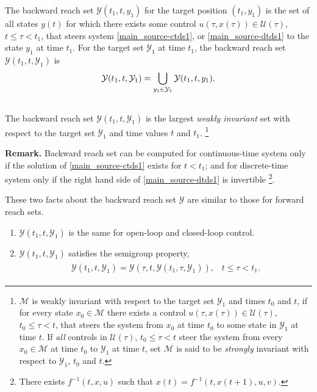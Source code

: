 \documentclass[letterpaper,10pt,english]{sphinxmanual}
\begin{document}
The backward reach set ${\mathcal Y}(t_1, t, y_1)$ for the target
position $(t_1, y_1)$ is the set of all states $y(t)$ for
which there exists some control
$u(\tau, x(\tau))\in{\mathcal U}(\tau)$,
$t\leqslant\tau<t_1$, that steers system \eqref{main_source-ctds1}, or \eqref{main_source-dtds1} to
the state $y_1$ at time $t_1$. For the target set
${\mathcal Y}_1$ at time $t_1$, the backward reach set
${\mathcal Y}(t_1, t, {\mathcal Y}_1)$ is
\begin{gather}
\begin{split}{\mathcal Y}(t_1, t, {\mathcal Y}_1) = \bigcup_{y_1\in{\mathcal Y}_1}{\mathcal Y}(t_1, t, y_1).\end{split}\notag\\\begin{split}\end{split}\notag
\end{gather}
The backward reach set
${\mathcal Y}(t_1, t, {\mathcal Y}_1)$ is the largest \emph{weakly
invariant} set with respect to the target set ${\mathcal Y}_1$ and
time values $t$ and $t_1$. \footnote{
${\mathcal M}$ is weakly invariant with respect to the target
set ${\mathcal Y}_1$ and times $t_0$ and $t$, if
for every state $x_0\in{\mathcal M}$ there exists a control
$u(\tau, x(\tau))\in{\mathcal U}(\tau)$,
$t_0\leqslant\tau< t$, that steers the system from $x_0$
at time $t_0$ to some state in ${\mathcal Y}_1$ at time
$t$. If \emph{all} controls in ${\mathcal U}(\tau)$,
$t_0\leqslant\tau<t$ steer the system from every
$x_0\in{\mathcal M}$ at time $t_0$ to
${\mathcal Y}_1$ at time $t$, set ${\mathcal M}$ is
said to be \emph{strongly} invariant with respect to
${\mathcal Y}_1$, $t_0$ and $t$.
}

\textbf{Remark.} Backward reach set can be computed for continuous-time
system only if the solution of \eqref{main_source-ctds1} exists for $t<t_1$; and
for discrete-time system only if the right hand side of \eqref{main_source-dtds1} is
invertible \footnote{
There exists $f^{-1}(t,x,u)$ such that
$x(t)=f^{-1}(t, x(t+1), u, v)$.
}.

These two facts about the backward reach set ${\mathcal Y}$ are
similar to those for forward reach sets.
\begin{enumerate}
\item {} 
${\mathcal Y}(t_1, t, {\mathcal Y}_1)$ is the same for
open-loop and closed-loop control.

\item {} 
${\mathcal Y}(t_1, t, {\mathcal Y}_1)$ satisfies the semigroup
property,
\label{main_source:equation-semigroup_b}\begin{gather}
\begin{split}{\mathcal Y}(t_1, t, {\mathcal Y}_1) = {\mathcal Y}(\tau, t, {\mathcal Y}(t_1, \tau, {\mathcal Y}_1)), \;\;\;
t\leqslant\tau< t_1.\end{split}\label{main_source-semigroup_b}
\end{gather}
\end{enumerate}
\end{document}
